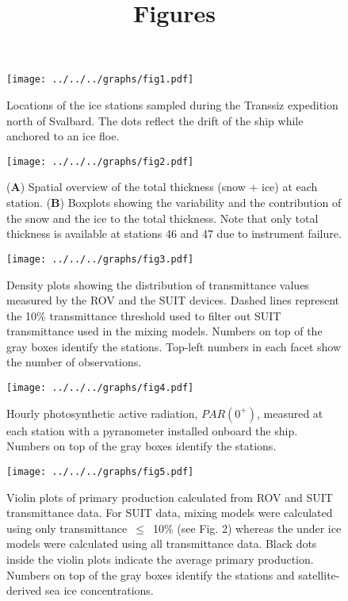 \documentclass[12pt,a4paper]{scrartcl}
\title{Figures}
\date{}
\begin{document}
\maketitle

\begin{figure}[h]
	\centering
	\texttt{[image: ../../../graphs/fig1.pdf]}
	\caption{Locations of the ice stations sampled during the Transsiz expedition north of Svalbard. The dots reflect the drift of the ship while anchored to an ice floe.}
\end{figure}

\clearpage
\newpage

\begin{figure}[h]
	\centering
	\texttt{[image: ../../../graphs/fig2.pdf]}
	\caption{(\textbf{A}) Spatial overview of the total thickness (snow + ice) at each station. (\textbf{B}) Boxplots showing the variability and the contribution of the snow and the ice to the total thickness. Note that only total thickness is available at stations 46 and 47 due to instrument failure.}
\end{figure}

\clearpage
\newpage

\begin{figure}[h]
	\centering
	\texttt{[image: ../../../graphs/fig3.pdf]}
	\caption{Density plots showing the distribution of transmittance values measured by the ROV and the SUIT devices. Dashed lines represent the 10\% transmittance threshold used to filter out SUIT transmittance used in the mixing models. Numbers on top of the gray boxes identify the stations. Top-left numbers in each facet show the number of observations.}
\end{figure}

\clearpage
\newpage

\begin{figure}[h]
	\centering
	\texttt{[image: ../../../graphs/fig4.pdf]}
	\caption{Hourly photosynthetic active radiation, $PAR(0^+)$, measured at each station with a pyranometer installed onboard the ship. Numbers on top of the gray boxes identify the stations.}
\end{figure}

\clearpage
\newpage

\begin{figure}[h]
	\centering
	\texttt{[image: ../../../graphs/fig5.pdf]}
	\caption{Violin plots of primary production calculated from ROV and SUIT transmittance data. For SUIT data, mixing models were calculated using only transmittance~$\le$~10\% (see Fig. 2) whereas the under ice models were calculated using all transmittance data. Black dots inside the violin plots indicate the average primary production. Numbers on top of the gray boxes identify the stations and satellite-derived sea ice concentrations.}
\end{figure}
\end{document}
